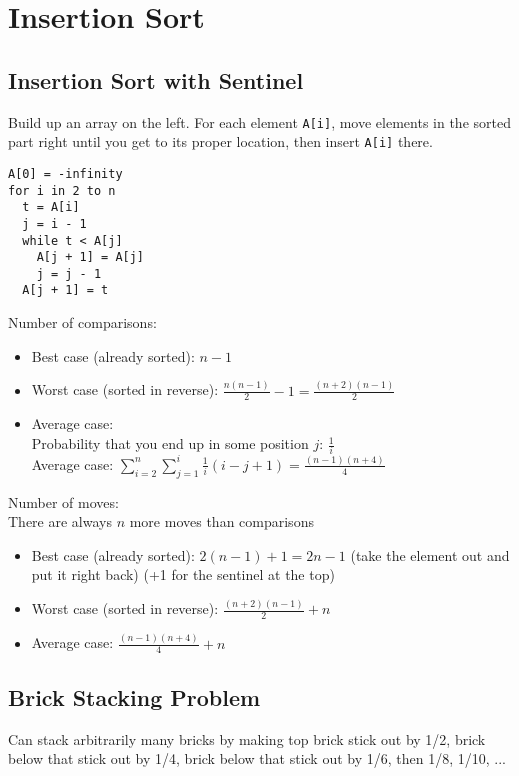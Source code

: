 \section{Insertion Sort}

\subsection{Insertion Sort with Sentinel}

Build up an array on the left. For each element \verb|A[i]|, move elements in the sorted part right until you get to its proper location, then insert \verb|A[i]| there.

\begin{verbatim}
A[0] = -infinity
for i in 2 to n
  t = A[i]
  j = i - 1
  while t < A[j]
    A[j + 1] = A[j]
    j = j - 1
  A[j + 1] = t
\end{verbatim}

Number of comparisons:
\begin{itemize}
    \item Best case (already sorted): $n - 1$
    \item Worst case (sorted in reverse): $\frac{n(n-1)}{2} - 1 = \frac{(n+2)(n-1)}{2}$
    \item Average case:\\
    Probability that you end up in some position $j$: $\frac 1 i$\\
    Average case: $\displaystyle \sum_{i=2}^n \sum_{j=1}^i \frac 1 i (i - j + 1) = \frac{(n-1)(n+4)}{4}$
\end{itemize}

Number of moves:\\
There are always $n$ more moves than comparisons
\begin{itemize}
    \item Best case (already sorted): $2(n-1) + 1 = 2n - 1$ (take the element out and put it right back) (+1 for the sentinel at the top)
    \item Worst case (sorted in reverse): $\displaystyle \frac{(n+2)(n-1)}{2} + n$
    \item Average case: $\displaystyle \frac{(n-1)(n+4)}{4} + n$
\end{itemize}

\subsection{Brick Stacking Problem}

Can stack arbitrarily many bricks by making top brick stick out by 1/2, brick below that stick out by 1/4, brick below that stick out by 1/6, then 1/8, 1/10, ...

